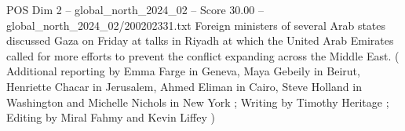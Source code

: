 \begin{textsample}{POS Dim 2 – global\_north\_2024\_02 – Score 30.00 – global\_north\_2024\_02/200202331.txt}
Foreign ministers of several Arab states discussed Gaza on Friday at talks in Riyadh at which the United Arab Emirates called for more efforts to prevent the conflict expanding across the Middle East. ( Additional reporting by Emma Farge in Geneva, Maya Gebeily in Beirut, Henriette Chacar in Jerusalem, Ahmed Eliman in Cairo, Steve Holland in Washington and Michelle Nichols in New York ; Writing by Timothy Heritage ; Editing by Miral Fahmy and Kevin Liffey )

\end{textsample}
